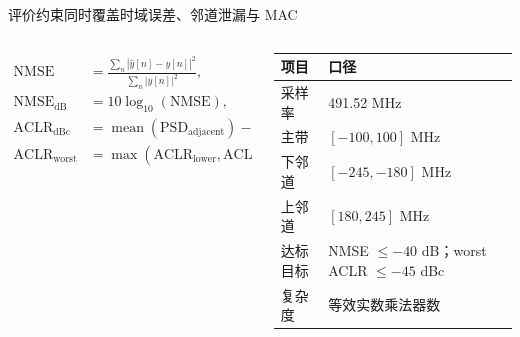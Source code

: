 \documentclass[20pt, cjk, slidetop, table]{beamer}
\begin{document}
\begin{frame}{评价约束同时覆盖时域误差、邻道泄漏与 MAC}
  \begin{columns}[T,onlytextwidth]
    \begin{column}{0.58\linewidth}
      \begin{align*}
        \mathrm{NMSE} &=
        \frac{\sum_n |\widehat{y}[n]-y[n]|^2}{\sum_n |y[n]|^2},\\
        \mathrm{NMSE}_{\mathrm{dB}} &= 10\log_{10}(\mathrm{NMSE}),\\[0.35em]
        \mathrm{ACLR}_{\mathrm{dBc}} &=
        \operatorname{mean}(\mathrm{PSD}_{\mathrm{adjacent}})
        - \operatorname{mean}(\mathrm{PSD}_{\mathrm{main}}),\\
        \mathrm{ACLR}_{\mathrm{worst}} &=
        \max(\mathrm{ACLR}_{\mathrm{lower}},\mathrm{ACLR}_{\mathrm{upper}}).
      \end{align*}
    \end{column}
    \begin{column}{0.37\linewidth}
      \begin{tabularx}{\linewidth}{l Y}
        \toprule
        项目 & 口径 \\
        \midrule
        采样率 & 491.52 MHz \\
        主带 & $[-100,100]$ MHz \\
        下邻道 & $[-245,-180]$ MHz \\
        上邻道 & $[180,245]$ MHz \\
        达标目标 & NMSE $\le -40$ dB；worst ACLR $\le -45$ dBc \\
        复杂度 & 等效实数乘法器数 \\
        \bottomrule
      \end{tabularx}
    \end{column}
  \end{columns}
\end{frame}
\end{document}
